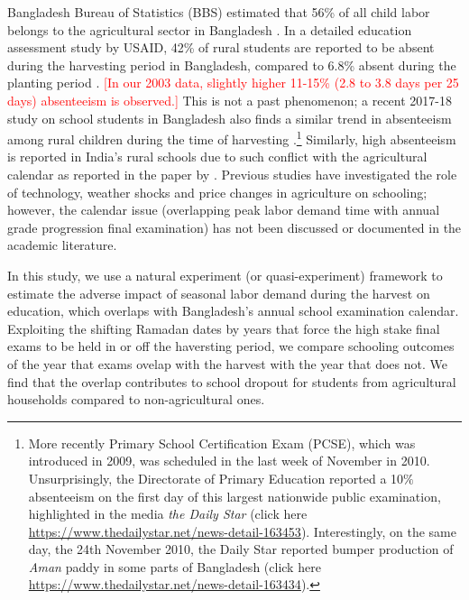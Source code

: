 \documentclass[12pt,letterpaper]{article}
\newcommand{\SAdded}[1]{\textcolor{red}{#1}}
\newcommand{\0}{\ensuremath{\mbox{\boldmath $0$}}}
\begin{document}
Bangladesh Bureau of Statistics (BBS) estimated that 56\% of all child labor belongs to the agricultural sector in Bangladesh \citep{bbs2003report}. In a detailed education assessment study by USAID, 42\% of rural students are reported to be absent during the harvesting period in Bangladesh, compared to 6.8\% absent during the planting period \citep[][Table IV.D.9, page 110]{Rahman2004}. \SAdded{[In our 2003 data, slightly higher 11-15\% (2.8 to 3.8 days per 25 days) absenteeism is observed.]} This is not a past phenomenon; a recent 2017-18 study on school students in Bangladesh also finds a similar trend in absenteeism among rural children during the time of harvesting \citep{Fujii2019}.\footnote{More recently Primary School Certification Exam (PCSE), which was introduced in 2009, was scheduled in the last week of November in 2010. Unsurprisingly, the Directorate of Primary Education reported a 10$\%$ absenteeism on the first day of this largest nationwide public examination, highlighted in the media \textit{the Daily Star} (click here \url{https://www.thedailystar.net/news-detail-163453}). Interestingly, on the same day, the 24th November 2010, the Daily Star reported bumper production of \textit{Aman} paddy in some parts of Bangladesh (click here \url{https://www.thedailystar.net/news-detail-163434}). } Similarly, high absenteeism is reported in India's rural schools due to such conflict with the agricultural calendar as reported in the paper by \cite{de2016estimating}. Previous studies have investigated the role of technology, weather shocks and price changes in agriculture on schooling; however, the calendar issue (overlapping peak labor demand time with annual grade progression final examination) has not been discussed or documented in the academic literature.

In this study, we use a natural experiment (or quasi-experiment) framework to estimate the adverse impact of seasonal labor demand during the harvest on education, which overlaps with Bangladesh's annual school examination calendar. Exploiting the shifting Ramadan dates by years that force the high stake final exams to be held in or off the haversting period, we compare schooling outcomes of the year that exams ovelap with the harvest with the year that does not. We find that the overlap contributes to school dropout for students from agricultural households compared to non-agricultural ones. 
\end{document}
